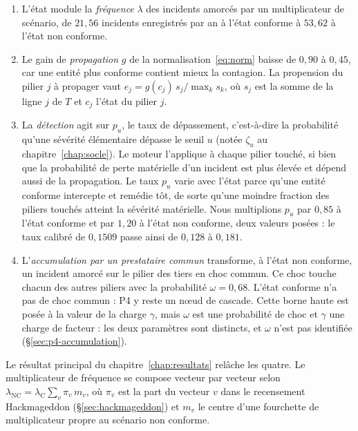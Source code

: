 \begin{enumerate}[leftmargin=1.5em,itemsep=2pt,topsep=2pt]
\item L'état module la \emph{fréquence} $\lambda$ des incidents amorcés par un multiplicateur de
  scénario, de $21{,}56$ incidents enregistrés par an à l'état conforme à $53{,}62$ à l'état non
  conforme.
\item Le gain de \emph{propagation} $g$ de la normalisation~\eqref{eq:norm} baisse de $0{,}90$ à
  $0{,}45$, car une entité plus conforme contient mieux la contagion. La propension du pilier $j$ à
  propager vaut $e_j=g(c_j)\,s_j/\max_k s_k$, où $s_j$ est la somme de la ligne $j$ de $T$ et
  $c_j$ l'état du pilier $j$.
\item La \emph{détection} agit sur $p_u$, le taux de dépassement, c'est-à-dire la probabilité
  qu'une sévérité élémentaire dépasse le seuil $u$ (notée $\zeta_u$ au chapitre~\ref{chap:socle}). Le moteur l'applique à chaque pilier touché, si bien que la probabilité de perte matérielle d'un incident est plus élevée et dépend aussi de la propagation. Le taux $p_u$ varie avec l'état parce qu'une entité conforme intercepte et remédie tôt, de sorte qu'une
  moindre fraction des piliers touchés atteint la sévérité matérielle. Nous multiplions $p_u$ par $0{,}85$
  à l'état conforme et par $1{,}20$ à l'état non conforme, deux valeurs posées : le taux calibré de
  $0{,}1509$ passe ainsi de $0{,}128$ à $0{,}181$.
\item L'\emph{accumulation par un prestataire commun} transforme, à l'état non conforme, un
  incident amorcé sur le pilier des tiers en choc commun. Ce choc touche chacun des autres piliers
  avec la probabilité $\omega=0{,}68$. L'état conforme n'a pas de choc commun : P4 y reste un n\oe{}ud de cascade. Cette borne haute est posée
  à la valeur de la charge $\gamma$, mais $\omega$ est une probabilité de choc et $\gamma$ une charge de facteur : les deux paramètres sont distincts, et $\omega$ n'est pas
  identifiée (\S\ref{sec:p4-accumulation}).
\end{enumerate}
Le résultat principal du chapitre~\ref{chap:resultats} relâche les quatre. Le multiplicateur de
fréquence se compose vecteur par vecteur selon $\lambda_{\text{NC}}=\lambda_{\text{C}}\sum_v \pi_v\,m_v$, où $\pi_v$ est la
part du vecteur $v$ dans le recensement Hackmageddon (\S\ref{sec:hackmageddon}) et $m_v$ le centre
d'une fourchette de multiplicateur propre au scénario non conforme.

